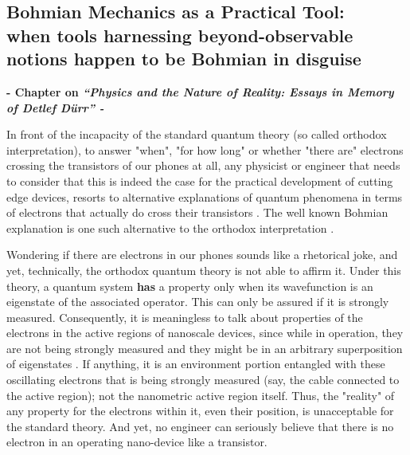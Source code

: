 \documentclass[11pt, a4paper]{article} %
\begin{document}
\newpage
{}
\setcounter{page}{1}
\begin{center}
\section*{ Bohmian Mechanics as a Practical Tool:\\ \vspace{0.2cm} \small when tools harnessing beyond-observable notions happen to be Bohmian in disguise }\vspace{-0.4cm}
{\bf \small - Chapter on {\em “Physics and the Nature of Reality: Essays in Memory of Detlef Dürr” - }}\vspace{-0.32cm}
\end{center}

\hspace*{4mm} In front of the incapacity of the standard quantum theory (so called orthodox interpretation), to answer "when", "for how long" or whether "there are" electrons crossing the transistors of our phones at all, any physicist or engineer that needs to consider that this is indeed the case for the practical development of cutting edge devices, resorts to alternative explanations of quantum phenomena in terms of electrons that actually do cross their transistors \cite{where}. The well known Bohmian explanation is one such alternative to the orthodox interpretation \cite{Bohm,Holland, Durr,JordiXavier}. \vspace{-0.1cm}

Wondering if there are electrons in our phones sounds like a rhetorical joke, and yet, technically, the orthodox quantum theory is not able to affirm it. Under this theory, a quantum system {\bf has} a property only when its wavefunction is an eigenstate of the associated operator. This can only be assured if it is strongly measured. Consequently, it is meaningless to talk about properties of the electrons in the active regions of nanoscale devices, since while in operation, they are not being strongly measured and they might be in an arbitrary superposition of eigenstates  \cite{where}. If anything, it is an environment portion entangled with these oscillating electrons that is being strongly measured (say, the cable connected to the active region); not the nanometric active region itself. Thus, the "reality" of any property for the electrons within it, even their position, is unacceptable for the standard theory. And yet, no engineer can seriously believe that there is no electron in an operating nano-device like a transistor.\vspace{-0.1cm} 
\end{document}
